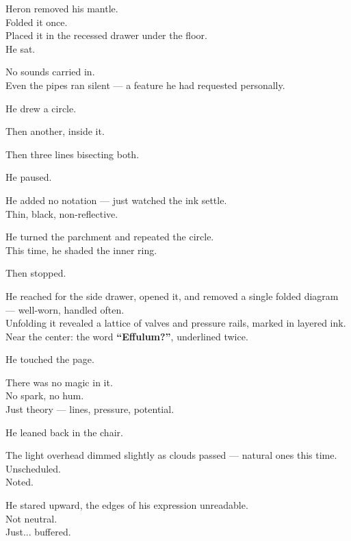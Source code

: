 \documentclass[9pt]{article}
\begin{document}
\vspace{1em}

Heron removed his mantle.\\
Folded it once.\\
Placed it in the recessed drawer under the floor.\\
He sat.

No sounds carried in.\\
Even the pipes ran silent — a feature he had requested personally.

\vspace{1em}

He drew a circle.

Then another, inside it.

Then three lines bisecting both.

He paused.

He added no notation — just watched the ink settle.\\
Thin, black, non-reflective.

He turned the parchment and repeated the circle.\\
This time, he shaded the inner ring.

Then stopped.

\vspace{1em}

He reached for the side drawer, opened it, and removed a single folded diagram — well-worn, handled often.\\
Unfolding it revealed a lattice of valves and pressure rails, marked in layered ink.\\
Near the center: the word \textbf{“Effulum?”}, underlined twice.

He touched the page.

\vspace{1em}

There was no magic in it.\\
No spark, no hum.\\
Just theory — lines, pressure, potential.

\vspace{1em}

He leaned back in the chair.

The light overhead dimmed slightly as clouds passed — natural ones this time.\\
Unscheduled.\\
Noted.

He stared upward, the edges of his expression unreadable.\\
Not neutral.\\
Just... buffered.
\end{document}
